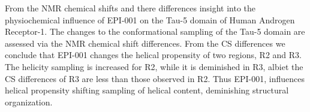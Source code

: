 From the NMR chemical shifts and there differences insight into the physiochemical influence of EPI-001 on the Tau-5 domain of Human Androgen Receptor-1. The changes to the conformational sampling of the Tau-5 domain are assessed via the NMR chemical shift differences. From the CS differences we conclude that EPI-001 changes the helical propensity of two regions, R2 and R3. The helicity sampling is increased for R2, while it is deminished in R3, albiet the CS differences of R3 are less than those observed in R2. Thus EPI-001, influences helical propensity shifting sampling of helical content, deminishing structural organization.  